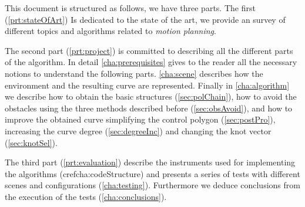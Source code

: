 \documentclass[dissertation.tex]{subfiles}
\begin{document}
This document is structured as follows, we have three parts. The first
(\cref{prt:stateOfArt})
Is dedicated to the state of the art, we provide an survey of
different topics and algorithms related to \emph{motion planning}.

The
second part (\cref{prt:project}) is committed to describing
all the different parts of the algorithm. In detail
\cref{cha:prerequisites} gives to the reader all the necessary notions
to understand the following parts. \cref{cha:scene} describes how the
environment and the resulting curve are represented. Finally in
\cref{cha:algorithm} we describe how to obtain the basic structures
(\cref{sec:polChain}), how to avoid the obstacles using the three
methods described before (\cref{sec:obsAvoid}), and how to improve the
obtained curve simplifying the control polygon (\cref{sec:postPro}),
increasing the curve degree (\cref{sec:degreeInc}) and changing the
\bs knot vector (\cref{sec:knotSel}).

The third part (\cref{prt:evaluation}) describe the instruments used
for implementing the algorithms (cref{cha:codeStructure}) and presents
a series of tests with
different scenes and configurations (\cref{cha:testing}). Furthermore
we deduce conclusions from the execution of the tests
(\cref{cha:conclusions}).
\end{document}
